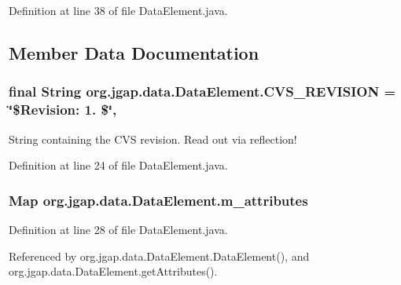 Definition at line 38 of file Data\-Element.\-java.



\subsection{Member Data Documentation}
\hypertarget{classorg_1_1jgap_1_1data_1_1_data_element_a5cd157821db31e85260466db09e5a41b}{
\subsubsection[{C\-V\-S\-\_\-\-R\-E\-V\-I\-S\-I\-O\-N}]{\setlength{\rightskip}{0pt plus 5cm}final String org.\-jgap.\-data.\-Data\-Element.\-C\-V\-S\-\_\-\-R\-E\-V\-I\-S\-I\-O\-N = \char`\"{}\$Revision\-: 1. \$\char`\"{}\hspace{0.3cm}{\ttfamily [static]}, {\ttfamily [private]}}}\label{classorg_1_1jgap_1_1data_1_1_data_element_a5cd157821db31e85260466db09e5a41b}
String containing the C\-V\-S revision. Read out via reflection! 

Definition at line 24 of file Data\-Element.\-java.

\hypertarget{classorg_1_1jgap_1_1data_1_1_data_element_a2bc614ef2a9e58775bbc30d4e6df1c07}{
\subsubsection[{m\-\_\-attributes}]{\setlength{\rightskip}{0pt plus 5cm}Map org.\-jgap.\-data.\-Data\-Element.\-m\-\_\-attributes\hspace{0.3cm}{\ttfamily [private]}}}\label{classorg_1_1jgap_1_1data_1_1_data_element_a2bc614ef2a9e58775bbc30d4e6df1c07}


Definition at line 28 of file Data\-Element.\-java.



Referenced by org.\-jgap.\-data.\-Data\-Element.\-Data\-Element(), and org.\-jgap.\-data.\-Data\-Element.\-get\-Attributes().

